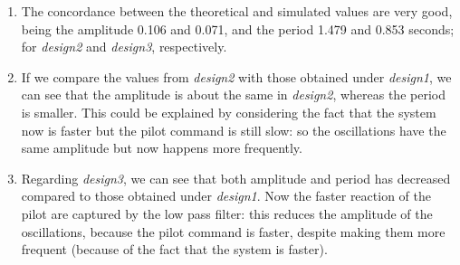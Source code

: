 \begin{enumerate}
\item The concordance between the theoretical and  simulated values are very good, being the amplitude 0.106 and 0.071, and the period 1.479 and 0.853 seconds; for \textit{design2} and \textit{design3}, respectively.

\item If we compare the values from \textit{design2} with those obtained under \textit{design1}, we can see that the amplitude is about the same in \textit{design2}, whereas the period is smaller. This could be explained by considering the fact that the system now is faster but the pilot command is still slow:  so the oscillations have the same amplitude but now happens more frequently.

\item Regarding \textit{design3}, we can see that both amplitude and period has decreased compared to those obtained under \textit{design1}. Now the faster reaction of the pilot are captured by the low pass filter: this reduces the amplitude of the oscillations, because the pilot command is faster, despite making them more frequent (because of the fact that the system is faster).
\end{enumerate}

